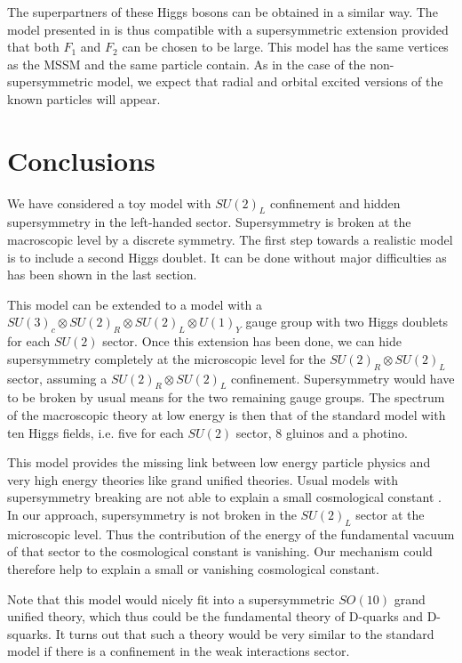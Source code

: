 \documentclass[a4paper,12pt]{article}
\begin{document}
The superpartners of these Higgs bosons can be obtained in a similar
way.  The model presented in \cite{CF} is thus compatible with a
supersymmetric extension provided that both $F_1$ and $F_2$ can be
chosen to be large. This model has the same vertices as the MSSM and
the same particle contain. As in the case of the non-supersymmetric
model, we expect that radial and orbital excited versions of the known
particles will appear.

\section{Conclusions}

We have considered a toy model with $SU(2)_L$ confinement and hidden
supersymmetry in the left-handed sector. Supersymmetry is broken at
the macroscopic level by a discrete symmetry. The first step towards a
realistic model is to include a second Higgs doublet. It can be done
without major difficulties as has been shown in the last section.

This model can be extended to a model with a $SU(3)_c \otimes SU(2)_R
\otimes SU(2)_L \otimes U(1)_Y$ gauge group with two Higgs doublets
for each $SU(2)$ sector.  Once this extension has been done, we can
hide supersymmetry completely at the microscopic level for the
$SU(2)_R \otimes SU(2)_L$ sector, assuming a $SU(2)_R \otimes SU(2)_L$
confinement.  Supersymmetry would have to be broken by usual means for
the two remaining gauge groups. The spectrum of the macroscopic theory
at low energy is then that of the standard model with ten Higgs
fields, i.e. five for each $SU(2)$ sector, 8 gluinos and a photino.


This model provides the missing link between low energy particle
physics and very high energy theories like grand unified theories.
Usual models with supersymmetry breaking are not able to explain a
small cosmological constant \cite{Witten:2000zk}. In our approach,
supersymmetry is not broken in the $SU(2)_L$ sector at the microscopic
level.  Thus the contribution of the energy of the fundamental vacuum
of that sector to the cosmological constant is vanishing. Our
mechanism could therefore help to explain a small or vanishing
cosmological constant.

Note that this model would nicely fit into a supersymmetric $SO(10)$
grand unified theory, which thus could be the fundamental theory of
D-quarks and D-squarks. It turns out that such a theory would be very
similar to the standard model if there is a confinement in the weak
interactions sector.
\end{document}

